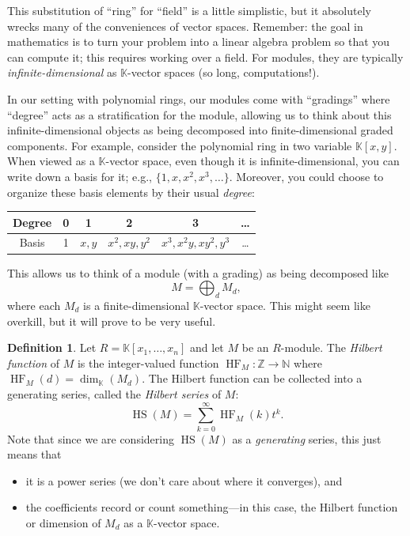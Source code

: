 \documentclass[12pt,a4paper]{article}
\newcommand{\KK}{\mathbb{K}}
\newcommand{\NN}{\mathbb{N}}
\newcommand{\ZZ}{\mathbb{Z}}
\DeclareMathOperator{\HF}{HF}
\DeclareMathOperator{\HS}{HS}
\theoremstyle{definition}
\newtheorem{definition}[theorem]{Definition}
\numberwithin{equation}{section}
\begin{document}
This substitution of ``ring'' for ``field'' is a little simplistic, but it absolutely wrecks many of the conveniences of vector spaces.
Remember: the goal in mathematics is to turn your problem into a linear algebra problem so that you can compute it; this requires working over a field.
For modules, they are typically \emph{infinite-dimensional} as $\KK$-vector spaces (so long, computations!).

In our setting with polynomial rings, our modules come with ``gradings'' where ``degree'' acts as a stratification for the module, allowing us to think about this infinite-dimensional objects as being decomposed into finite-dimensional graded components.
For example, consider the polynomial ring in two variable $\KK[x,y]$.
When viewed as a $\KK$-vector space, even though it is infinite-dimensional, you can write down a basis for it; e.g., $\{ 1, x, x^2, x^3, \dots \}$.
Moreover, you could choose to organize these basis elements by their usual \emph{degree}:
\begin{center}
    {\renewcommand{\arraystretch}{2.5}
    \begin{tabular}{|c||c|c|c|c|c|}
        \hline
        Degree & 0 & 1 & 2 & 3 & \dots \\
        \hline
        Basis & 1 & $x, y$ & $x^2, xy, y^2$ & $x^3, x^2 y, x y^2, y^3$ & \dots \\
        \hline
    \end{tabular}}
\end{center}
This allows us to think of a module (with a grading) as being decomposed like
\begin{equation*}
    M = \bigoplus_d M_d,
\end{equation*}
where each $M_d$ is a finite-dimensional $\KK$-vector space.
This might seem like overkill, but it will prove to be very useful.

\begin{definition}
    Let $R = \KK[x_1,\dots,x_n]$ and let $M$ be an $R$-module.
    The \emph{Hilbert function} of $M$ is the integer-valued function $\HF_M \colon \ZZ \to \NN$ where $\HF_M(d) = \dim_{\KK}(M_d)$.
    The Hilbert function can be collected into a generating series, called the \emph{Hilbert series} of $M$:
    \begin{equation*}
        \HS(M) = \sum_{k=0}^\infty \HF_M(k) t^k.
    \end{equation*}
    Note that since we are considering $\HS(M)$ as a \emph{generating} series, this just means that 
    \begin{itemize}
        \item it is a power series (we don't care about where it converges), and
        \item the coefficients record or count something---in this case, the Hilbert function or dimension of $M_d$ as a $\KK$-vector space.
    \end{itemize}
\end{definition}
\end{document}
